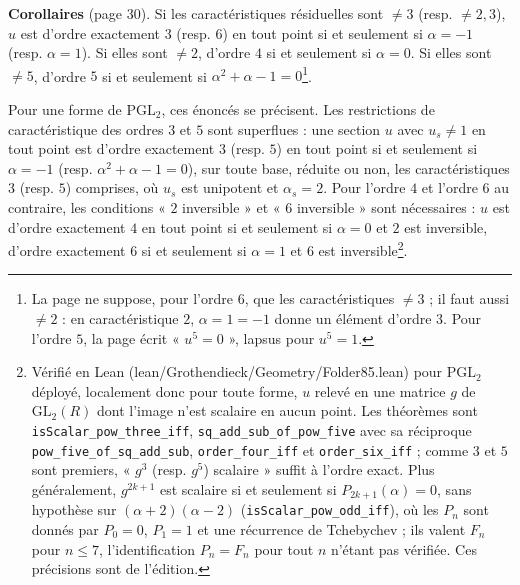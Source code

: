 \documentclass[11pt,a4paper]{article}
\begin{document}
\textbf{Corollaires} (page 30). Si les caractéristiques résiduelles sont $\neq 3$
(resp. $\neq 2, 3$), $u$ est d'ordre exactement $3$ (resp. $6$) en tout point
si et seulement si $\alpha = -1$ (resp. $\alpha = 1$). Si elles sont $\neq 2$,
d'ordre $4$ si et seulement si $\alpha = 0$. Si elles sont $\neq 5$, d'ordre
$5$ si et seulement si $\alpha^2 + \alpha - 1 = 0$\footnote{La page ne suppose,
pour l'ordre $6$, que les caractéristiques $\neq 3$ ; il faut aussi $\neq 2$ :
en caractéristique $2$, $\alpha = 1 = -1$ donne un élément d'ordre $3$. Pour
l'ordre $5$, la page écrit « $u^5 = 0$ », lapsus pour $u^5 = 1$.}.

Pour une forme de $\mathrm{PGL}_2$, ces énoncés se précisent. Les
restrictions de caractéristique des ordres $3$ et $5$ sont superflues : une
section $u$ avec $u_s \neq 1$ en tout point est d'ordre exactement $3$
(resp. $5$) en tout point si et seulement si $\alpha = -1$ (resp. $\alpha^2 +
\alpha - 1 = 0$), sur toute base, réduite ou non, les caractéristiques $3$
(resp. $5$) comprises, où $u_s$ est unipotent et $\alpha_s = 2$. Pour l'ordre
$4$ et l'ordre $6$ au contraire, les conditions « $2$ inversible » et
« $6$ inversible » sont nécessaires : $u$ est d'ordre exactement $4$ en tout
point si et seulement si $\alpha = 0$ et $2$ est inversible, d'ordre exactement
$6$ si et seulement si $\alpha = 1$ et $6$ est inversible\footnote{Vérifié en
Lean (lean/Grothendieck/Geometry/Folder85.lean) pour $\mathrm{PGL}_2$ déployé,
localement donc pour toute forme, $u$ relevé en une matrice $g$ de
$\mathrm{GL}_2(R)$ dont l'image n'est scalaire en aucun point. Les théorèmes
sont \texttt{isScalar\_pow\_three\_iff}, \texttt{sq\_add\_sub\_of\_pow\_five}
avec sa réciproque \texttt{pow\_five\_of\_sq\_add\_sub},
\texttt{order\_four\_iff} et \texttt{order\_six\_iff} ; comme $3$ et $5$ sont
premiers, « $g^3$ (resp. $g^5$) scalaire » suffit à l'ordre exact. Plus
généralement, $g^{2k+1}$ est scalaire si et seulement si $P_{2k+1}(\alpha) =
0$, sans hypothèse sur $(\alpha + 2)(\alpha - 2)$
(\texttt{isScalar\_pow\_odd\_iff}), où les $P_n$ sont donnés par $P_0 = 0$,
$P_1 = 1$ et une récurrence de Tchebychev ; ils valent $F_n$ pour $n \leq 7$,
l'identification $P_n = F_n$ pour tout $n$ n'étant pas vérifiée. Ces
précisions sont de l'édition.}.
\end{document}
